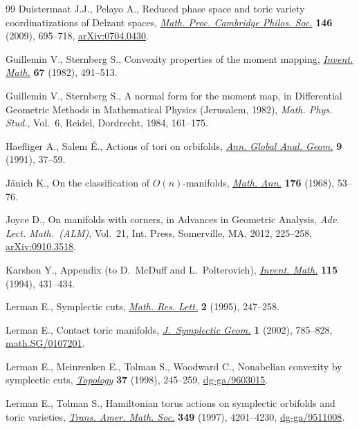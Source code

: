 \documentclass[pdftex]{sigma}
\numberwithin{equation}{section}
\begin{document}
\begin{thebibliography}{99}
Duistermaat J.J., Pelayo A., Reduced phase space and toric variety
  coordinatizations of {D}elzant spaces, \href{http://dx.doi.org/10.1017/S0305004108002077}{\textit{Math. Proc. Cambridge Philos.
  Soc.}} \textbf{146} (2009), 695--718, \href{http://arxiv.org/abs/0704.0430}{arXiv:0704.0430}.

Guillemin V., Sternberg S., Convexity properties of the moment mapping,
  \href{http://dx.doi.org/10.1007/BF01398933}{\textit{Invent. Math.}} \textbf{67} (1982), 491--513.

Guillemin V., Sternberg S., A normal form for the moment map, in Dif\/ferential
  Geometric Methods in Mathematical Physics ({J}erusalem, 1982), \textit{Math.
  Phys. Stud.}, Vol.~6, Reidel, Dordrecht, 1984, 161--175.

Haef\/liger A., Salem {\'E}., Actions of tori on orbifolds, \href{http://dx.doi.org/10.1007/BF02411354}{\textit{Ann. Global
  Anal. Geom.}} \textbf{9} (1991), 37--59.

J{\"a}nich K., On the classif\/ication of {$O(n)$}-manifolds, \href{http://dx.doi.org/10.1007/BF02052956}{\textit{Math. Ann.}}
  \textbf{176} (1968), 53--76.

Joyce D., On manifolds with corners, in Advances in Geometric Analysis,
  \textit{Adv. Lect. Math.~(ALM)}, Vol.~21, Int. Press, Somerville, MA, 2012,
  225--258, \href{http://arxiv.org/abs/0910.3518}{arXiv:0910.3518}.

Karshon Y., Appendix (to {D}.~{M}c{D}uf\/f and {L}.~{P}olterovich),
  \href{http://dx.doi.org/10.1007/BF01231767}{\textit{Invent. Math.}} \textbf{115} (1994), 431--434.

Lerman E., Symplectic cuts, \href{http://dx.doi.org/10.4310/MRL.1995.v2.n3.a2}{\textit{Math. Res. Lett.}} \textbf{2} (1995),
  247--258.

Lerman E., Contact toric manifolds, \href{http://dx.doi.org/10.4310/JSG.2001.v1.n4.a6}{\textit{J.~Symplectic Geom.}} \textbf{1}
  (2002), 785--828, \href{http://arxiv.org/abs/math.SG/0107201}{math.SG/0107201}.

Lerman E., Meinrenken E., Tolman S., Woodward C., Nonabelian convexity by
  symplectic cuts, \href{http://dx.doi.org/10.1016/S0040-9383(97)00030-X}{\textit{Topology}} \textbf{37} (1998), 245--259,
  \href{http://arxiv.org/abs/dg-ga/9603015}{dg-ga/9603015}.

Lerman E., Tolman S., Hamiltonian torus actions on symplectic orbifolds and
  toric varieties, \href{http://dx.doi.org/10.1090/S0002-9947-97-01821-7}{\textit{Trans. Amer. Math. Soc.}} \textbf{349} (1997),
  4201--4230, \href{http://arxiv.org/abs/dg-ga/9511008}{dg-ga/9511008}.


\end{thebibliography}
\end{document}
